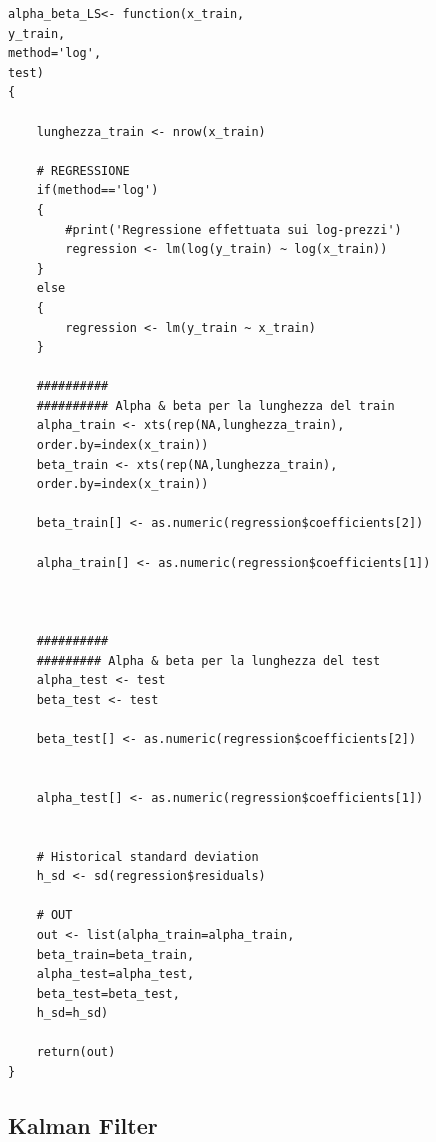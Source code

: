 \documentclass[]{article}
\begin{document}
\begin{lstlisting}
alpha_beta_LS<- function(x_train,
y_train,
method='log',
test)
{
	
	lunghezza_train <- nrow(x_train)
	
	# REGRESSIONE
	if(method=='log')
	{
		#print('Regressione effettuata sui log-prezzi')
		regression <- lm(log(y_train) ~ log(x_train))
	}
	else
	{
		regression <- lm(y_train ~ x_train)
	}
	
	##########
	########## Alpha & beta per la lunghezza del train
	alpha_train <- xts(rep(NA,lunghezza_train),
	order.by=index(x_train))
	beta_train <- xts(rep(NA,lunghezza_train),
	order.by=index(x_train))
	
	beta_train[] <- as.numeric(regression$coefficients[2])
	
	alpha_train[] <- as.numeric(regression$coefficients[1])
	
	
	
	##########
	######### Alpha & beta per la lunghezza del test
	alpha_test <- test
	beta_test <- test
	
	beta_test[] <- as.numeric(regression$coefficients[2])
	
	
	alpha_test[] <- as.numeric(regression$coefficients[1])
	
	
	# Historical standard deviation
	h_sd <- sd(regression$residuals)
	
	# OUT
	out <- list(alpha_train=alpha_train,
	beta_train=beta_train,
	alpha_test=alpha_test,
	beta_test=beta_test,
	h_sd=h_sd)
	
	return(out)
}

\end{lstlisting}

\subsection*{Kalman Filter}
\end{document}

